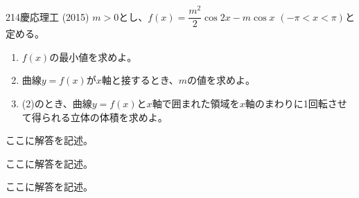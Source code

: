 \begin{thm}{214}{}{慶応理工 (2015)}
 $m>0$とし、$f(x)=\dfrac{m^2}{2}\cos 2x-m\cos x$ $(-\pi<x<\pi)$と定める。
 \begin{enumerate}
  \item $f(x)$の最小値を求めよ。
  \item 曲線$y=f(x)$が$x$軸と接するとき、$m$の値を求めよ。
  \item (2)のとき、曲線$y=f(x)$と$x$軸で囲まれた領域を$x$軸のまわりに1回転させて得られる立体の体積を求めよ。
 \end{enumerate}
\end{thm}

ここに解答を記述。

ここに解答を記述。

ここに解答を記述。
